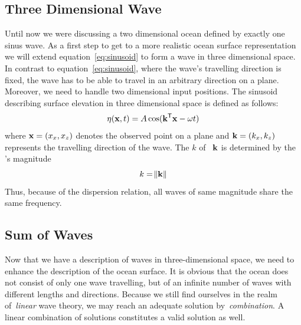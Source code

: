 \subsection{Three Dimensional Wave}
Until now we were discussing a two dimensional ocean defined by exactly one sinus wave. As a first
step to get to a more realistic ocean surface representation we will extend equation~\ref{eq:sinusoid}
to form a wave in three dimensional space. In contrast to equation~\ref{eq:sinusoid}, where the wave's
travelling direction is fixed, the wave has to be able to travel in an arbitrary direction on a plane.
Moreover, we need to handle two dimensional input positions. The sinusoid describing surface elevation
in three dimensional space is defined as follows:
\begin{equation}
\label{eq:sinusoid_3d}
 \eta(\mathbf{x}, t) = A\cos(\mathbf{k}^{\mathsf{T}}\mathbf{x} - \omega t)
\end{equation}
where $\mathbf{x} = (x_x, x_z)$ denotes the observed point on a plane and $\mathbf{k} = (k_x, k_z)$ represents
the travelling direction of the wave. The \wavenumber $k$ of~\emph{\wavevector} $\mathbf{k}$ is determined by
the \wavevector's magnitude
\begin{equation}
 k = \norm{\mathbf{k}}
\end{equation}
Thus, because of the dispersion relation, all waves of same magnitude share the same frequency.

\subsection{Sum of Waves}
Now that we have a description of waves in three-dimensional space, we need to
enhance the description of the ocean surface. It is obvious that the ocean does
not consist of only one wave travelling, but of an infinite number of waves with
different lengths and directions. Because we still find ourselves in the realm
of~\emph{linear} wave theory, we may reach an adequate solution
by~\emph{combination}. A linear combination of solutions constitutes a valid
solution as well.\\

